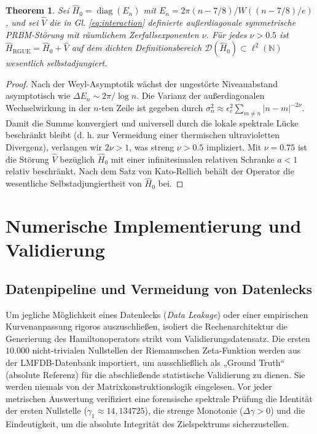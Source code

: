 \documentclass[aps,prl,preprint,superscriptaddress,floatfix]{revtex4-2}
\newtheorem{theorem}{Theorem}[section]
\newcommand{\N}{\mathbb{N}}
\begin{document}
\begin{theorem}
\label{thm:kato_rellich_prbm}
Sei $\hat{H}_0 = \operatorname{diag}(E_n)$ mit $E_n = 2\pi (n - 7/8) / W((n - 7/8)/e)$, und sei $\hat{V}$ die in Gl. \ref{eq:interaction} definierte außerdiagonale symmetrische PRBM-Störung mit räumlichem Zerfallsexponenten $\nu$. Für jedes $\nu > 0.5$ ist $\hat{H}_{\text{RGUE}} = \hat{H}_0 + \hat{V}$ auf dem dichten Definitionsbereich $\mathcal{D}(\hat{H}_0) \subset \ell^2(\N)$ wesentlich selbstadjungiert.
\end{theorem}

\begin{proof}
Nach der Weyl-Asymptotik wächst der ungestörte Niveauabstand asymptotisch wie $\Delta E_n \sim 2\pi / \log n$. Die Varianz der außerdiagonalen Wechselwirkung in der $n$-ten Zeile ist gegeben durch $\sigma_n^2 \approx \epsilon_c^2 \sum_{m \neq n} |n-m|^{-2\nu}$. Damit die Summe konvergiert und universell durch die lokale spektrale Lücke beschränkt bleibt (d. h. zur Vermeidung einer thermischen ultravioletten Divergenz), verlangen wir $2\nu > 1$, was streng $\nu > 0.5$ impliziert. Mit $\nu = 0.75$ ist die Störung $\hat{V}$ bezüglich $\hat{H}_0$ mit einer infinitesimalen relativen Schranke $a < 1$ relativ beschränkt. Nach dem Satz von Kato-Rellich \cite{ReedSimon1975} behält der Operator die wesentliche Selbstadjungiertheit von $\hat{H}_0$ bei.
\end{proof}

\section{Numerische Implementierung und Validierung}

\subsection{Datenpipeline und Vermeidung von Datenlecks}
Um jegliche Möglichkeit eines Datenlecks (\textit{Data Leakage}) oder einer empirischen Kurvenanpassung rigoros auszuschließen, isoliert die Rechenarchitektur die Generierung des Hamiltonoperators strikt vom Validierungsdatensatz. Die ersten $10.000$ nicht-trivialen Nullstellen der Riemannschen Zeta-Funktion werden aus der LMFDB-Datenbank \cite{LMFDB} importiert, um ausschließlich als „Ground Truth“ (absolute Referenz) für die abschließende statistische Validierung zu dienen. Sie werden niemals von der Matrixkonstruktionslogik eingelesen. Vor jeder metrischen Auswertung verifiziert eine forensische spektrale Prüfung die Identität der ersten Nullstelle ($\gamma_1 \approx 14,134725$), die strenge Monotonie ($\Delta \gamma > 0$) und die Eindeutigkeit, um die absolute Integrität des Zielspektrums sicherzustellen.
\end{document}
